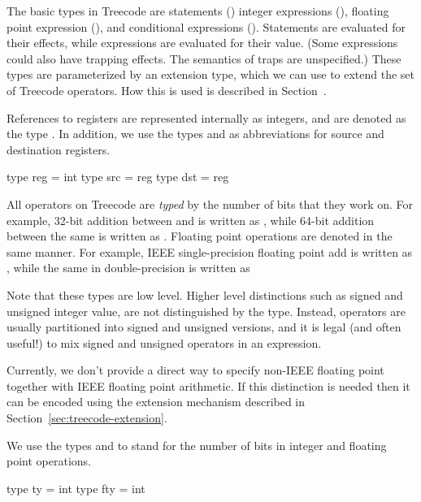   The basic types in Treecode are statements ()
integer expressions (), 
floating point expression (), 
and conditional expressions (). 
Statements are evaluated for their effects,
while expressions are evaluated for their value. (Some expressions
could also have trapping effects.  The semantics of traps are unspecified.)
These types are parameterized by an extension
type, which we can use to extend the set of Treecode 
operators.  How this is used is described in Section~.

References to registers are represented internally as integers, and are denoted
as the type . In addition, we use the types  and 
as abbreviations for source and destination registers.
\begin{SML}
   type reg = int
   type src = reg
   type dst = reg
\end{SML}

All operators on Treecode are \emph{typed}
by the number of bits that 
they work on.  For example, 32-bit addition between  and 
is written as , while 64-bit addition between the same
is written as .  Floating point operations are
denoted in the same manner.  For example, IEEE single-precision floating
point add is written as , while the same in
double-precision is written as  

Note that these types are low level.  Higher level distinctions such
as signed and unsigned integer value, are not distinguished by the type.  
Instead, operators are usually partitioned into signed and unsigned versions, 
and it is legal (and often useful!) to mix signed and unsigned operators in
an expression.

Currently, we don't provide a direct way to specify non-IEEE floating point 
together with
IEEE floating point arithmetic.  If this distinction is needed then
it can be encoded using the extension mechanism described
in Section~\ref{sec:treecode-extension}.

We use the types  and  to stand for the number of
bits in integer and floating point operations.  
\begin{SML}
  type ty  = int
  type fty = int
\end{SML}

